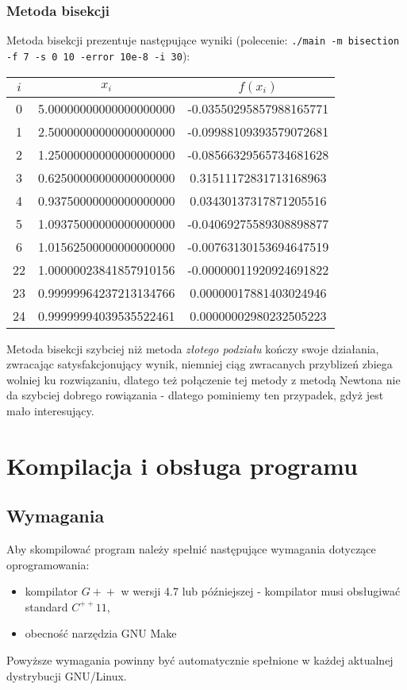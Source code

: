 \documentclass[a4paper,11pt]{article}
\begin{document}
    \subsubsection{Metoda bisekcji}
    Metoda bisekcji prezentuje następujące wyniki (polecenie: \texttt{./main -m bisection -f 7 -s 0 10 -error 10e-8 -i 30}):
     \begin{center}
      \begin{tabular}{S[table-format=1.0]S[table-format=-1.9]S[table-format=-1.15,table-auto-round=false]}
        \toprule
        {$i$}                & {$x_i$}               & {$f(x_i)$}            \\  & 5.00000000000000000000 & -0.03550295857988165771 \\
          1 & 2.50000000000000000000 & -0.09988109393579072681 \\
          2 & 1.25000000000000000000 & -0.08566329565734681628 \\
          3 & 0.62500000000000000000 & 0.31511172831713168963 \\
          4 & 0.93750000000000000000 & 0.03430137317871205516 \\
          5 & 1.09375000000000000000 & -0.04069275589308898877 \\
          6 & 1.01562500000000000000 & -0.00763130153694647519 \\
          22 & 1.00000023841857910156 & -0.00000011920924691822 \\
          23 & 0.99999964237213134766 & 0.00000017881403024946 \\
          24 & 0.99999994039535522461 & 0.00000002980232505223 \\ \bottomrule
        \end{tabular}
    \end{center}
    Metoda bisekcji szybciej niż metoda \emph{złotego podziału} kończy swoje działania, zwracając satysfakcjonujący wynik, niemniej ciąg zwracanych przyblizeń zbiega wolniej ku rozwiązaniu, dlatego też połączenie tej metody z metodą Newtona nie da szybciej dobrego rowiązania - dlatego pominiemy ten przypadek, gdyż jest mało interesujący.
    
     
  \section{Kompilacja i obsługa programu}
    \subsection{Wymagania}
    Aby skompilować program należy spełnić następujące wymagania dotyczące oprogramowania:
    \begin{itemize}
      \item kompilator $ G\!+\!+ $ w wersji 4.7 lub późniejszej - kompilator musi obsługiwać standard $ C^{++}11 $,
      \item obecność narzędzia GNU Make
    \end{itemize}
    Powyższe wymagania powinny być automatycznie spełnione w każdej aktualnej dystrybucji GNU/Linux.
    
\end{document}
